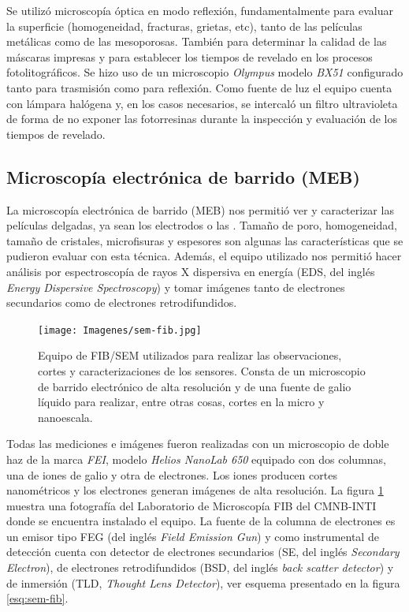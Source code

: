 		Se utilizó microscopía óptica en modo reflexión, fundamentalmente para evaluar la superficie (homogeneidad, fracturas, grietas, etc), tanto de las películas metálicas como de las mesoporosas. También para determinar la calidad de las máscaras impresas y para establecer los tiempos de revelado en los procesos fotolitográficos. Se hizo uso de un microscopio \textit{Olympus} modelo \textit{BX51} configurado tanto para trasmisión como para reflexión. Como fuente de luz el equipo cuenta con lámpara halógena y, en los casos necesarios, se intercaló un filtro ultravioleta de forma de no exponer las fotorresinas durante la inspección y evaluación de los tiempos de revelado.
	
	\vspace*{-0.12cm}\subsection{Microscopía electrónica de barrido (MEB)}\label{sec:SEM}

		La microscopía electrónica de barrido (MEB) nos permitió ver y caracterizar las películas delgadas, ya sean los electrodos o las \pdm. Tamaño de poro, homogeneidad, tamaño de cristales, microfisuras y espesores son algunas las características que se pudieron evaluar con esta técnica. Además, el equipo utilizado nos permitió hacer análisis por espectroscopía de rayos X dispersiva en energía (EDS, del inglés \textit{Energy Dispersive Spectroscopy}) y tomar imágenes tanto de electrones secundarios como de electrones retrodifundidos. \cite{Goodhew2000,Watt1997}


			\begin{figure}[b!]
			 		  \begin{center}
			 		  \texttt{[image: Imagenes/sem-fib.jpg]}
			 		  \caption[Microscopio de doble haz FIB/SEM]{Equipo de FIB/SEM utilizados para realizar las observaciones, cortes y caracterizaciones de los sensores. Consta de un microscopio de barrido electrónico de alta resolución y de una fuente de galio líquido para realizar, entre otras cosas, cortes en la micro y nanoescala.}
			 		  \label{fig:sem-fib}
			 		  \end{center}
			 		  \vspace*{-2mm}
			 		  \end{figure}


		Todas las mediciones e imágenes fueron realizadas con un microscopio de doble haz de la marca \textit{FEI}, modelo \textit{Helios NanoLab 650} equipado con dos columnas, una de iones de galio y otra de electrones. Los iones producen cortes nanométricos y los electrones generan imágenes de alta resolución. La figura \ref{fig:sem-fib} muestra una fotografía del Laboratorio de Microscopía FIB del CMNB-INTI donde se encuentra instalado el equipo. La fuente de la columna de electrones es un emisor tipo FEG (del inglés \textit{Field Emission Gun}) y como instrumental de detección cuenta con detector de electrones secundarios (SE, del inglés \textit{Secondary Electron}), de electrones retrodifundidos (BSD, del inglés \textit{back scatter detector}) y de inmersión (TLD, \textit{Thought Lens Detector}), ver esquema presentado en la figura \ref{esq:sem-fib}. 

